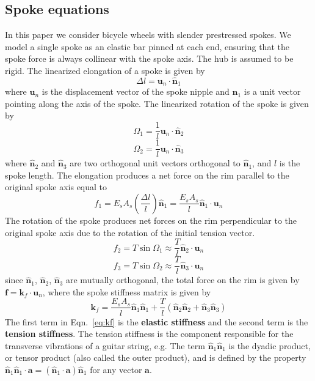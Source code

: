 \documentclass{bmd2016p}
\newcommand{\n}{\ensuremath{\hat{\bm{n}}_1}}
\newcommand{\nn}{\ensuremath{\hat{\bm{n}}_2}}
\newcommand{\nnn}{\ensuremath{\hat{\bm{n}}_3}}
\begin{document}
\subsection{Spoke equations}

In this paper we consider bicycle wheels with slender prestressed spokes. We model a single spoke as an elastic bar pinned at each end, ensuring that the spoke force is always collinear with the spoke axis. The hub is assumed to be rigid. The linearized elongation of a spoke is given by
	\begin{equation}\label{eq:selong}
	\Delta l = \bm{u}_n\cdot \n
	\end{equation}
where $\bm{u}_n$ is the displacement vector of the spoke nipple and \n{} is a unit vector pointing along the axis of the spoke. The linearized rotation of the spoke is given by
	\begin{equation}\label{eq:srot1}
	\Omega_1 = \frac{1}{l} \bm{u}_n\cdot \nn
	\end{equation}
	\begin{equation}\label{eq:srot2}
	\Omega_2 = \frac{1}{l} \bm{u}_n\cdot \nnn
	\end{equation}
where \nn{} and \nnn{} are two orthogonal unit vectors orthogonal to \n{}, and $l$ is the spoke length. The elongation produces a net force on the rim parallel to the original spoke axis equal to
	\begin{equation}\label{eq:sF1}
	f_1 = E_sA_s\left(\frac{\Delta l}{l}\right)\n = \frac{E_sA_s}{l} \n \cdot \bm{u}_n 
	\end{equation}
The rotation of the spoke produces net forces on the rim perpendicular to the original spoke axis due to the rotation of the initial tension vector.
	\begin{equation}\label{eq:sF2}
	f_2 = T \sin{\Omega_1} \approx \frac{T}{l} \nn \cdot \bm{u}_n
	\end{equation}
	\begin{equation}\label{eq:sF3}
	f_3 = T \sin{\Omega_2} \approx \frac{T}{l} \nnn \cdot \bm{u}_n
	\end{equation}
since \n{}, \nn{}, \nnn{} are mutually orthogonal, the total force on the rim is given by $\bm{f} = \bm{k}_f \cdot \bm{u}_n$, where the spoke stiffness matrix is given by
	\begin{equation}\label{eq:kf}
	\bm{k}_f = \frac{E_sA_s}{l}\n\n + \frac{T}{l}(\nn\nn + \nnn\nnn)
	\end{equation}
The first term in Eqn.~\ref{eq:kf} is the {\bf elastic stiffness} and the second term is the {\bf tension stiffness}. The tension stiffness is the component responsible for the transverse vibrations of a guitar string, e.g. The term $\n\n$ is the dyadic product, or tensor product (also called the outer product), and is defined by the property $\n\n\cdot \bm{a} = (\n\cdot \bm{a})\n$ for any vector $\bm{a}$.
\end{document}
